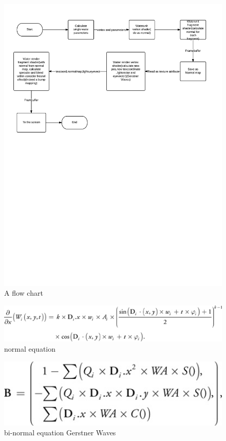 \documentclass[12pt,letterpaper]{article}
\begin{document}
\begin{figure}[p]
    \centering
    \includegraphics[width=1.0\textwidth]{flow.jpeg}
    \caption{A flow chart}
\end{figure}
\begin{figure}[p]
    \centering
    \includegraphics[width=1.0\textwidth]{fig2.jpg}
    \caption{normal equation}
\end{figure}
\begin{figure}[p]
    \centering
    \includegraphics[width=1.0\textwidth]{B.jpg}
    \caption{bi-normal equation Gerstner Waves}
\end{figure}
\end{document}
